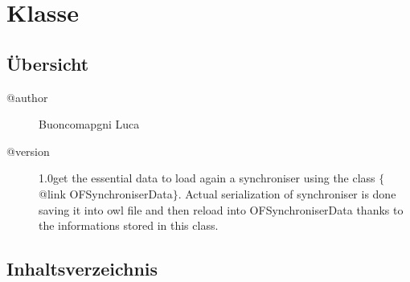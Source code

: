 
\section[OFSerializeSynchroniserData]{Klasse }\label{ontologyFramework.OFContextManagement.synchronisingManager.OFSerializeSynchroniserData-class}
\subsection{Übersicht}

\begin{description}
\item[@author] 
Buoncomapgni Luca
\item[@version] 
1.0\bl  get the essential data to load again a synchroniser using the class $\{$ @link OFSynchroniserData$\}$.
 Actual serialization of synchroniser is done saving it into owl file and then reload into OFSynchroniserData
 thanks to the informations stored in this class.
\end{description}
\subsection{Inhaltsverzeichnis}
